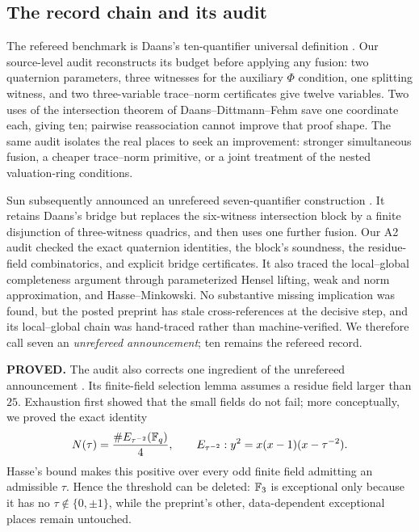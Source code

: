 \subsection{The record chain and its audit}

The refereed benchmark is Daans's ten-quantifier universal definition
\cite{daans}.  Our source-level audit reconstructs its budget before applying
any fusion: two quaternion parameters, three witnesses for the auxiliary
$\Phi$ condition, one splitting witness, and two three-variable trace--norm
certificates give twelve variables.  Two uses of the intersection theorem
of Daans--Dittmann--Fehm save one coordinate each, giving ten; pairwise
reassociation cannot improve that proof shape.  The same audit isolates the
real places to seek an improvement: stronger simultaneous fusion, a cheaper
trace--norm primitive, or a joint treatment of the nested valuation-ring
conditions.

Sun subsequently announced an unrefereed seven-quantifier construction
\cite{sun}.  It retains Daans's bridge but replaces the six-witness
intersection block by a finite disjunction of three-witness quadrics, and
then uses one further fusion.  Our A2 audit checked the exact quaternion
identities, the block's soundness, the residue-field combinatorics, and
explicit bridge certificates.  It also traced the local--global completeness
argument through parameterized Hensel lifting, weak and norm approximation,
and Hasse--Minkowski.  No substantive missing implication was found, but the
posted preprint has stale cross-references at the decisive step, and its
local--global chain was hand-traced rather than machine-verified.  We
therefore call seven an \emph{unrefereed announcement}; ten remains the
refereed record.

\textbf{PROVED.}  The audit also corrects one ingredient of the unrefereed announcement
\cite{sun}.  Its finite-field selection lemma assumes a residue field larger
than $25$.  Exhaustion first showed that the small fields do not fail; more
conceptually, we proved the exact identity
\[
 N(\tau)=\frac{\#E_{\tau^{-2}}(\mathbb{F}_q)}{4},\qquad
 E_{\tau^{-2}}:y^2=x(x-1)(x-\tau^{-2}).
\]
Hasse's bound makes this positive over every odd finite field admitting an
admissible $\tau$.  Hence the threshold can be deleted: $\mathbb{F}_3$ is exceptional
only because it has no $\tau\notin\{0,\pm1\}$, while the preprint's other,
data-dependent exceptional places remain untouched.

